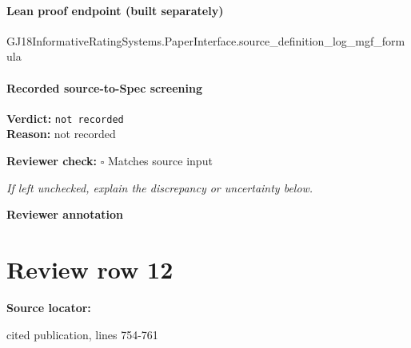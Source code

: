 \documentclass[10pt]{article}
\newcommand{\reviewerbox}{%
  \par\noindent\fbox{\parbox{0.96\linewidth}{\rule{0pt}{0.38in}}}\par
}
\newcommand{\reviewmatch}[1]{%
  \par\noindent\textbf{Reviewer check:} $\square$\; #1\par
  \noindent\emph{If left unchecked, explain the discrepancy or uncertainty below.}\par
}
\begin{document}
\paragraph{Lean proof endpoint (built separately)}\begin{ReviewVerbatim}
GJ18InformativeRatingSystems.PaperInterface.source_definition_log_mgf_formula
\end{ReviewVerbatim}

\paragraph{Recorded source-to-Spec screening}
\textbf{Verdict:} \texttt{not recorded}
\\
\textbf{Reason:} not recorded
\reviewmatch{Matches source input}
\noindent\textbf{Reviewer annotation}\par
\reviewerbox
\clearpage
\hypertarget{source-claim-343f2a6db19144da}{}
\section*{Review row 12}
\textbf{Source locator:} {\footnotesize\raggedright cited publication, lines 754-\allowbreak{}761\par}
\end{document}
